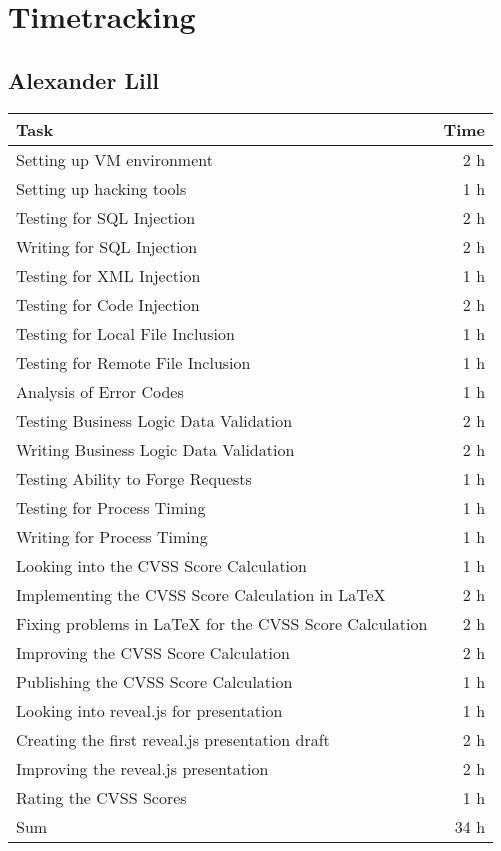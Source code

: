 \chapter{Timetracking}\label{chapter:timetracking}
\section*{Alexander Lill}
\begin{table}[h!tpb]
  \centering
  \begin{tabularx}{\textwidth}{X r}
    \toprule
      Task & Time \\
    \midrule
      Setting up VM environment & 2 h \\
      Setting up hacking tools & 1 h \\
      Testing for SQL Injection & 2 h \\
      Writing for SQL Injection & 2 h \\
      Testing for XML Injection & 1 h \\
      Testing for Code Injection & 2 h \\
      Testing for Local File Inclusion & 1 h \\
      Testing for Remote File Inclusion & 1 h \\
      Analysis of Error Codes & 1 h \\
      Testing Business Logic Data Validation & 2 h \\
      Writing Business Logic Data Validation & 2 h \\
      Testing Ability to Forge Requests & 1 h \\
      Testing for Process Timing & 1 h \\
      Writing for Process Timing & 1 h \\
      Looking into the CVSS Score Calculation & 1 h \\
      Implementing the CVSS Score Calculation in \LaTeX{} & 2 h \\
      Fixing problems in \LaTeX{} for the CVSS Score Calculation & 2 h \\
      Improving the CVSS Score Calculation & 2 h \\
      Publishing the CVSS Score Calculation & 1 h \\
      Looking into reveal.js for presentation & 1 h \\
      Creating the first reveal.js presentation draft & 2 h \\
      Improving the reveal.js presentation & 2 h \\
      Rating the CVSS Scores & 1 h \\
    \midrule
      Sum & 34 h \\
    \bottomrule
  \end{tabularx}
\end{table}

